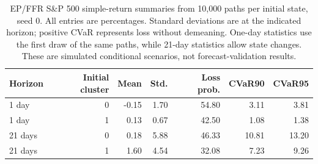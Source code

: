 \begin{table}[htbp]
\centering
\small
\begin{tabularx}{\textwidth}{@{}Xrrrrrr@{}}
\toprule
Horizon & Initial cluster & Mean & Std. & Loss prob. & CVaR90 & CVaR95\\
\midrule
1 day & 0 & -0.15 & 1.70 & 54.80 & 3.11 & 3.81\\
1 day & 1 & 0.13 & 0.67 & 42.50 & 1.08 & 1.38\\
21 days & 0 & 0.18 & 5.88 & 46.33 & 10.81 & 13.20\\
21 days & 1 & 1.60 & 4.54 & 32.08 & 7.23 & 9.26\\
\bottomrule
\end{tabularx}
\caption{EP/FFR S\&P 500 simple-return summaries from 10,000 paths per initial state, seed 0. All entries are percentages. Standard deviations are at the indicated horizon; positive CVaR represents loss without demeaning. One-day statistics use the first draw of the same paths, while 21-day statistics allow state changes. These are simulated conditional scenarios, not forecast-validation results.}
\label{tab:fixed11-ep-returns}
\end{table}
